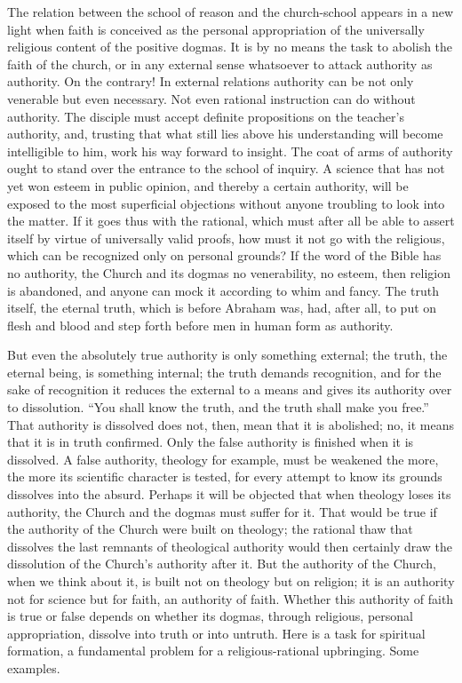 \documentclass[12pt,a4paper,openany]{book}
\newcommand{\opage}[1]{\marginnote{\footnotesize\textit{[#1]}}}
\begin{document}
The relation between the school of reason and the church-school appears
in a new light when faith is conceived as the personal appropriation of
the universally religious content of the positive dogmas. It is by no
means the task to abolish the faith of the church, or in any external
sense whatsoever to attack authority as authority. On the contrary! In
external relations authority can be not only venerable but even
necessary. Not even rational instruction can do without authority. The
disciple must accept definite propositions on the teacher's authority,
and, trusting that what still lies above his understanding will become
intelligible to him, work his way forward to insight. The coat of arms of
authority ought to stand over the entrance to the school of inquiry. A
science that has not yet won esteem in public opinion, and thereby a
certain authority, will be exposed to the most superficial objections
without anyone troubling to look into the matter. If it goes thus with
the rational, which must after all be able to assert itself by virtue of
universally valid \opage{28}proofs, how must it not go with the religious, which
can be recognized only on personal grounds? If the word of the Bible has
no authority, the Church and its dogmas no venerability, no esteem, then
religion is abandoned, and anyone can mock it according to whim and
fancy. The truth itself, the eternal truth, which is before Abraham was,
had, after all, to put on flesh and blood and step forth before men in
human form as authority.

But even the absolutely true authority is only something external; the
truth, the eternal being, is something internal; the truth demands
recognition, and for the sake of recognition it reduces the external to
a means and gives its authority over to dissolution. ``You shall know the
truth, and the truth shall make you free.'' That authority is dissolved
does not, then, mean that it is abolished; no, it means that it is in
truth confirmed. Only the false authority is finished when it is
dissolved. A false authority, theology for example, must be weakened the
more, the more its scientific character is tested, for every attempt to
know its grounds dissolves into the absurd. Perhaps it will be objected
that when theology loses its authority, the Church and the dogmas must
suffer for it. That would be true if the authority of the Church were
built on theology; the rational thaw that dissolves the last remnants of
theological authority would then certainly draw the dissolution of the
Church's authority after it. But the authority of the Church, when we
think about it, is built not on theology but on religion; it is an
authority not for science but for faith, an authority of faith. Whether
this authority of faith is true or false depends on whether its dogmas,
through religious, personal appropriation, dissolve \opage{29}into truth or into
untruth. Here is a task for spiritual formation, a fundamental problem
for a religious-rational upbringing. Some examples.
\end{document}
